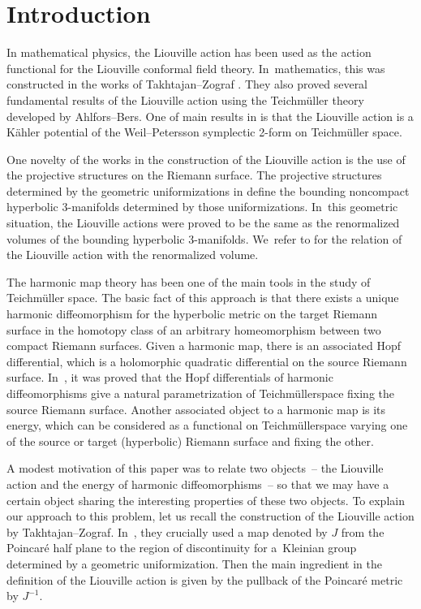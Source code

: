 \documentclass[pdftex]{sigma}%
\numberwithin{equation}{section}
\newcommand{\Te}{Teichm\"{u}ller\:}
\begin{document}
\section{Introduction}

In mathematical physics, the Liouville action has been used as the action functional for the Liouville conformal field theory. In~mathematics, this was constructed in the works of Takhtajan--Zograf \cite{TZ88-1, TZ88-2}. They also proved several fundamental results of the Liouville action using the Teichm\"uller theory developed by Ahlfors--Bers. One of main results in \cite{TZ88-1, TZ88-2} is that the Liouville action is a K\"ahler potential of the Weil--Petersson symplectic 2-form on Teichm\"uller space.

One novelty of the works \cite{TZ88-1, TZ88-2} in the construction of the Liouville action
is the use of the projective structures on the Riemann surface. The projective structures determined by the geometric uniformizations in \cite{2, TZ88-1, TZ88-2} define the bounding noncompact hyperbolic 3-manifolds determined by those uniformizations. In~this geometric situation, the Liouville actions were proved to be the same as the renormalized volumes of the bounding hyperbolic 3-manifolds. We~refer to
\cite{Kras00, Kras-Sch08, 1, PT17, 2} for the relation of the Liouville action with the renormalized volume.

The harmonic map theory has been one of the main tools in the study of Teichm\"uller space.
The basic fact of this approach is that
there exists a unique harmonic diffeomorphism for the hyperbolic metric on the target Riemann surface in the homotopy class of an arbitrary homeomorphism between two compact Riemann surfaces.
Given a harmonic map, there is an associated Hopf differential, which is a holomorphic quadratic differential
on the source Riemann surface. In~\cite{Sam,W89}, it was proved that the Hopf differentials of harmonic diffeomorphisms give a natural parametrization of \Te space
fixing the source Riemann surface. Another asso\-ciated object to a harmonic map is its energy,
which can be considered as a functional on \Te space varying one of the source or target (hyperbolic) Riemann surface and fixing the other.

A modest motivation of this paper was to relate two objects~-- the Liouville action and the energy of harmonic diffeomorphisms~-- so that we may
have a certain object sharing the interesting properties of these two objects. To explain our approach to this problem, let us recall the construction of the Liouville action by Takhtajan--Zograf. In~\cite{TZ88-1,TZ88-2}, they crucially used a map
denoted by $J$ from the Poincar\'e half plane to the region of discontinuity for a~Kleinian group determined by a geometric uniformization. Then the main ingredient in the definition of the Liouville action is given by the pullback of the Poincar\'e metric by $J^{-1}$.
\end{document}
